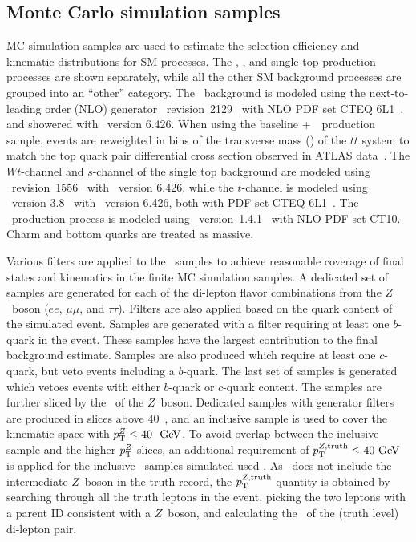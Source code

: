 \FloatBarrier
\subsection{Monte Carlo simulation samples}
\label{sec:mc_samples}

MC simulation samples are used to estimate the selection efficiency
and kinematic distributions for SM processes.
The \TTBAR, \ZGAMMAJETS, and single top
production processes are shown separately, while all the other SM background
processes are grouped into an ``other'' category.
The \TTBAR\ background is modeled using the next-to-leading order (NLO)
generator \POWHEG\ 
revision~2129~\cite{Nason:2004rx, Frixione:2007vw, Alioli:2010xd,
Frixione:2007nw} with NLO PDF set CTEQ 6L1~\cite{Nadolsky:2008zw}, and 
showered with \PYTHIA\ version 6.426.
When using the baseline \POWHEG+\PYTHIA\ \TTBAR\ production sample,
events are reweighted in bins of the transverse mass (\pt) of the
$t\bar{t}$ system to match the top quark pair differential cross section
observed in ATLAS data~\cite{Aad:2012hg,Aad:2014zka}.
The $Wt$-channel and $s$-channel of the single top background are modeled using
\POWHEG\ revision~1556~\cite{Alioli:2009je}
with \PYTHIA\ version 6.426, while the $t$-channel is modeled using
\acermc\ version 3.8~\cite{Kersevan:2004yg} with \PYTHIA\ version 6.426,
both with PDF set CTEQ 6L1~\cite{Nadolsky:2008zw}.
The \ZGAMMAJETS\ production process is modeled using
\SHERPA\ version~1.4.1~\cite{Gleisberg:2008ta} with NLO PDF set CT10.
Charm and bottom quarks are treated as massive.

Various filters are applied to the \ZGAMMAJETS\ samples to achieve
reasonable coverage of final states and kinematics in the finite MC simulation
samples.
A dedicated set of samples are generated for each of the di-lepton flavor
combinations from the $Z$~boson ($ee$, $\mu\mu$, and $\tau\tau$).
Filters are also applied based on the quark content of the simulated event.
Samples are generated with a filter requiring at least one $b$-quark in the
event.
These samples have the largest contribution to the final background estimate.
Samples are also produced which require at least one $c$-quark, but veto events
including a $b$-quark.
The last set of samples is generated which vetoes events with either $b$-quark
or $c$-quark content.
The samples are further sliced by the \pt\ of the $Z$~boson.
Dedicated samples with generator filters are produced in slices above 40~\GeV,
and an inclusive sample is used to cover the kinematic space with
$\pt^{Z} \leq 40~\GeV$.
To avoid overlap between the inclusive sample and the higher $p_{\mathrm{T}}^{Z}$ slices,
an additional requirement of $\pt^{Z,\mathrm{truth}} \leq 40 \GeV$ is applied
for the inclusive \ZGAMMAJETS\ samples simulated used \sherpa.
As \sherpa\ does not include the intermediate $Z$~boson in the truth record,
the $p_{\mathrm{T}}^{Z,\mathrm{truth}}$ quantity is obtained by searching through all the
truth leptons in the event, picking the two leptons with a parent ID
consistent with a $Z$~boson, and calculating the \pt\ of the (truth level) 
di-lepton pair.

